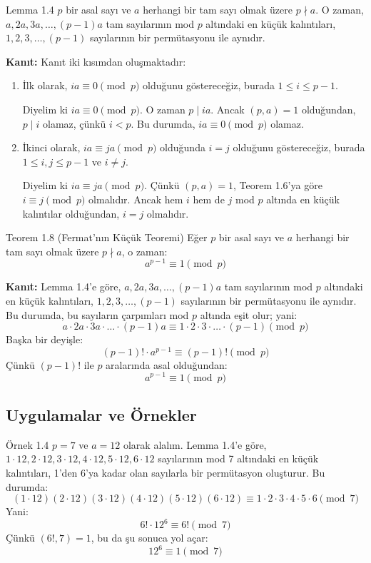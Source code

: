 \begin{theorembox}{Lemma 1.4}
$p$ bir asal sayı ve $a$ herhangi bir tam sayı olmak üzere $p \nmid a$. O zaman, $a, 2a, 3a, \dots, (p-1)a$ tam sayılarının mod $p$ altındaki en küçük kalıntıları, $1, 2, 3, \dots, (p-1)$ sayılarının bir permütasyonu ile aynıdır.

\textbf{Kanıt:}  
Kanıt iki kısımdan oluşmaktadır:
\begin{enumerate}
    \item İlk olarak, $ia \equiv 0 \pmod{p}$ olduğunu göstereceğiz, burada $1 \leq i \leq p - 1$. 

    Diyelim ki $ia \equiv 0 \pmod{p}$. O zaman $p \mid ia$. Ancak $(p, a) = 1$ olduğundan, $p \mid i$ olamaz, çünkü $i < p$. Bu durumda, $ia \equiv 0 \pmod{p}$ olamaz.

    \item İkinci olarak, $ia \equiv ja \pmod{p}$ olduğunda $i = j$ olduğunu göstereceğiz, burada $1 \leq i, j \leq p - 1$ ve $i \neq j$.

    Diyelim ki $ia \equiv ja \pmod{p}$. Çünkü $(p, a) = 1$, Teorem 1.6'ya göre $i \equiv j \pmod{p}$ olmalıdır. Ancak hem $i$ hem de $j$ mod $p$ altında en küçük kalıntılar olduğundan, $i = j$ olmalıdır.
\end{enumerate}
\end{theorembox}

\begin{theorembox}{Teorem 1.8 (Fermat'nın Küçük Teoremi)}
Eğer $p$ bir asal sayı ve $a$ herhangi bir tam sayı olmak üzere $p \nmid a$, o zaman:
\[
a^{p-1} \equiv 1 \pmod{p}
\]

\textbf{Kanıt:}  
Lemma 1.4'e göre, $a, 2a, 3a, \dots, (p-1)a$ tam sayılarının mod $p$ altındaki en küçük kalıntıları, $1, 2, 3, \dots, (p-1)$ sayılarının bir permütasyonu ile aynıdır. Bu durumda, bu sayıların çarpımları mod $p$ altında eşit olur; yani:
\[
a \cdot 2a \cdot 3a \cdot \dots \cdot (p-1)a \equiv 1 \cdot 2 \cdot 3 \cdot \dots \cdot (p-1) \pmod{p}
\]
Başka bir deyişle:
\[
(p-1)! \cdot a^{p-1} \equiv (p-1)! \pmod{p}
\]
Çünkü $(p-1)!$ ile $p$ aralarında asal olduğundan:
\[
a^{p-1} \equiv 1 \pmod{p}
\]
\end{theorembox}

\subsection*{Uygulamalar ve Örnekler}

\begin{examplebox}{Örnek 1.4}
$p = 7$ ve $a = 12$ olarak alalım. Lemma 1.4'e göre, $1 \cdot 12, 2 \cdot 12, 3 \cdot 12, 4 \cdot 12, 5 \cdot 12, 6 \cdot 12$ sayılarının mod 7 altındaki en küçük kalıntıları, 1'den 6'ya kadar olan sayılarla bir permütasyon oluşturur. Bu durumda:
\[
(1 \cdot 12)(2 \cdot 12)(3 \cdot 12)(4 \cdot 12)(5 \cdot 12)(6 \cdot 12) \equiv 1 \cdot 2 \cdot 3 \cdot 4 \cdot 5 \cdot 6 \pmod{7}
\]
Yani:
\[
6! \cdot 12^6 \equiv 6! \pmod{7}
\]
Çünkü $(6!, 7) = 1$, bu da şu sonuca yol açar:
\[
12^6 \equiv 1 \pmod{7}
\]
\end{examplebox}

